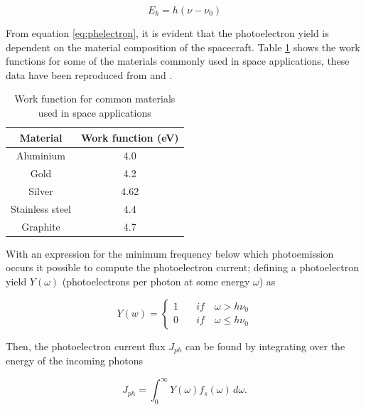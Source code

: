 \begin{equation}\label{eq:phfreq}
    E_{k} = h(\nu - \nu_0)
\end{equation}

From equation \eqref{eq:phelectron}, it is evident that the photoelectron yield is dependent on the material composition of the spacecraft. Table \ref{tab:workfunc} shows the work functions for some of the materials commonly used in space applications, these data have been reproduced from \parencite{Feuerbacher1972} and \parencite{TaylorandFrancisGroup2019}.

\begin{table}[h!]
    \centering
    \begin{tabular}{|c|c|}
        \hline
        \textbf{Material} & \textbf{Work function (eV)} \\ \hline
        Aluminium         & 4.0                    \\ \hline
        Gold              & 4.2                    \\ \hline
        Silver            & 4.62                   \\ \hline
        Stainless steel   & 4.4                    \\ \hline
        Graphite          & 4.7                    \\ \hline
    \end{tabular}
    \caption{Work function for common materials used in space applications}
    \label{tab:workfunc}
\end{table}

With an expression for the minimum frequency below which photoemission occurs it possible to compute the photoelectron current; defining a photoelectron yield $Y(\omega)$  (photoelectrons per photon at some energy $\omega$) as

\begin{equation} \label{eq:naivePhYield}
    Y(w) = 
    \begin{cases}
        1 \quad& if \quad \omega > h \nu_0 \\
        0 \quad& if \quad \omega \leqslant h \nu_0
    \end{cases}
\end{equation}


Then, the photoelectron current flux $J_{ph}$ can be found by integrating over the energy of the incoming photons \parencite[Ch. 7]{Chen2018}

\begin{equation}\label{eq:phCurrentNaive}
    J_{ph} = \int^\infty_0 Y(\omega) f_s(\omega) \, d\omega.
\end{equation}


